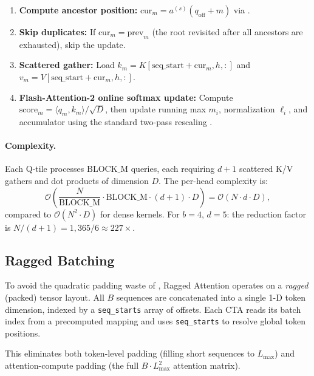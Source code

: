 \documentclass{article}
\newcommand{\method}{Ragged Attention}
\newcommand{\bigO}[1]{\mathcal{O}(#1)}
\newcommand{\numtokens}{N}
\newcommand{\depth}{d}
\newcommand{\branching}{b}
\newcommand{\headdim}{D}
\newcommand{\batchsize}{B}
\begin{document}
\begin{enumerate}[leftmargin=*,itemsep=2pt]
  \item \textbf{Compute ancestor position:}
    $\text{cur}_m = a^{(s)}(q_{\text{off}} + m)$ via .
  \item \textbf{Skip duplicates:} If $\text{cur}_m = \text{prev}_m$
    (the root revisited after all ancestors are exhausted), skip the update.
  \item \textbf{Scattered gather:}
    Load $k_m = K[\text{seq\_start} + \text{cur}_m, h, :]$ and
    $v_m = V[\text{seq\_start} + \text{cur}_m, h, :]$.
  \item \textbf{Flash-Attention-2 online softmax update:}
    Compute $\text{score}_m = \langle q_m, k_m \rangle / \sqrt{\headdim}$,
    then update running max $m_i$, normalization $\ell_i$, and
    accumulator using the standard two-pass rescaling
    \cite{milakov2018online}.
\end{enumerate}

\paragraph{Complexity.}
Each Q-tile processes $\text{BLOCK\_M}$ queries, each requiring
$\depth + 1$ scattered K/V gathers and dot products of dimension
$\headdim$.
The per-head complexity is:
\begin{equation}
  \bigO{\frac{\numtokens}{\text{BLOCK\_M}} \cdot \text{BLOCK\_M} \cdot (\depth + 1) \cdot \headdim}
  = \bigO{\numtokens \cdot \depth \cdot \headdim},
\end{equation}
compared to $\bigO{\numtokens^2 \cdot \headdim}$ for dense kernels.
For $\branching = 4$, $\depth = 5$: the reduction factor is
$\numtokens / (\depth + 1) = 1{,}365 / 6 \approx 227\times$.

\subsection{Ragged Batching}

To avoid the quadratic padding waste of ,
\method{} operates on a \emph{ragged} (packed) tensor layout.
All $\batchsize$ sequences are concatenated into a single 1-D token
dimension, indexed by a \texttt{seq\_starts} array of offsets.
Each CTA reads its batch index from a precomputed mapping and
uses \texttt{seq\_starts} to resolve global token positions.

This eliminates both token-level padding (filling short sequences
to $L_{\max}$) and attention-compute padding (the full
$\batchsize \cdot L_{\max}^2$ attention matrix).
\end{document}
